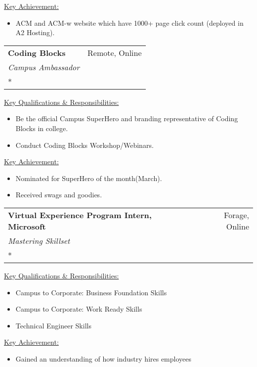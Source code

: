 \documentclass[letterpaper,11pt]{article}
\makeatletter
\newcommand{\resumeSubheading}[4]{
  \vspace{-1pt}\item
    \begin{tabular*}{0.97\textwidth}{l@{\extracolsep{\fill}}r}
      \textbf{#1} & #2 \\
      \textit{\small#3} & \textit{\small #4} \\
    \end{tabular*}\vspace{-5pt}
}
\makeatother
\begin{document}
        \hspace{1cm}\underline{Key Achievement:}
        \begin{itemize}
            \item ACM and ACM-w website which have 1000+ page click count (deployed in A2 Hosting).
        \end{itemize}
        
    \resumeSubheading
      {Coding Blocks}{Remote, Online}
      {Campus Ambassador} {February 2021 - present \\* } 
      
        \vspace{1mm}\hspace{1cm}\underline{Key Qualifications \& Responsibilities:}
          \begin{itemize}
              \item Be the official Campus SuperHero and branding representative of Coding
Blocks in college.
              \item Conduct Coding Blocks Workshop/Webinars.
        
          \end{itemize}
          
        \hspace{1cm}\underline{Key Achievement:}
        \begin{itemize}
            \item Nominated for SuperHero of the month(March).
            \item Received swags and goodies. 
        \end{itemize}
        \resumeSubheading
      {Virtual Experience Program Intern, Microsoft}{Forage, Online}
      {Mastering Skillset} {July 2020 - August 2020 \\* } 
      
        \vspace{1mm}\hspace{1cm}\underline{Key Qualifications \& Responsibilities:}
          \begin{itemize}
              \item Campus to Corporate: Business Foundation Skills
              \item Campus to Corporate: Work Ready Skills
              \item Technical Engineer Skills
          \end{itemize}
          
        \hspace{1cm}\underline{Key Achievement:}
        \begin{itemize}
            \item Gained an understanding of how industry hires employees
        \end{itemize}
        
\end{document}
